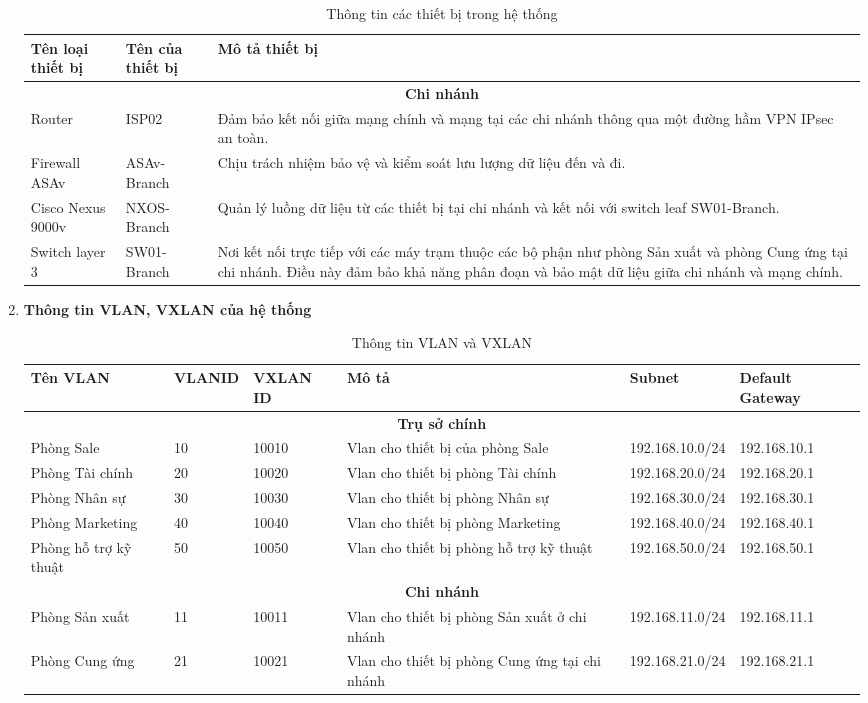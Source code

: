 \documentclass[13pt]{article}
\begin{document}
\begin{enumerate}
\begin{table}[h!]
\centering
\begin{tabular}{|p{2cm}|p{5cm}|p{7cm}|}
\hline
\textbf{Tên loại thiết bị} & \textbf{Tên của thiết bị} & \textbf{Mô tả thiết bị} \\ 
\hline
\multicolumn{3}{|c|}{\textbf{Chi nhánh}} \\ 
\hline
Router & ISP02 & Đảm bảo kết nối giữa mạng chính và mạng tại các chi nhánh thông qua một đường hầm VPN IPsec an toàn.\\
\hline
Firewall ASAv & ASAv-Branch & Chịu trách nhiệm bảo vệ và kiểm soát lưu lượng dữ liệu đến và đi.\\
\hline
Cisco Nexus 9000v & NXOS-Branch & Quản lý luồng dữ liệu từ các thiết bị tại chi nhánh và kết nối với switch leaf SW01-Branch.\\
\hline
Switch layer 3 & SW01-Branch & Nơi kết nối trực tiếp với các máy trạm thuộc các bộ phận như phòng Sản xuất và phòng Cung ứng tại chi nhánh. Điều này đảm bảo khả năng phân đoạn và bảo mật dữ liệu giữa chi nhánh và mạng chính.\\
\hline
\end{tabular}
\caption{Thông tin các thiết bị trong hệ thống}
\label{tab:comparison}
\end{table}


\item \textbf{Thông tin VLAN, VXLAN của hệ thống}
\begin{table}[h!]
\centering
\begin{tabular}{|p{2cm}|p{2cm}|p{2cm}|p{2.5cm}|p{2.5cm}|p{2.5cm}|}
\hline
\textbf{Tên VLAN} & \textbf{VLANID} & \textbf{VXLAN ID} & \textbf{Mô tả} & \textbf{Subnet} & \textbf{Default Gateway}\\ 
\hline
\multicolumn{6}{|c|}{\textbf{Trụ sở chính}} \\ 
\hline
Phòng Sale & 10 & 10010 & Vlan cho thiết bị của phòng Sale & 192.168.10.0/24 & 192.168.10.1\\
\hline
Phòng Tài chính & 20 & 10020 & Vlan cho thiết bị phòng Tài chính & 192.168.20.0/24 & 192.168.20.1\\
\hline
Phòng Nhân sự & 30 & 10030 & Vlan cho thiết bị phòng Nhân sự & 192.168.30.0/24 & 192.168.30.1 \\
\hline
Phòng Marketing & 40 & 10040 & Vlan cho thiết bị phòng Marketing & 192.168.40.0/24 & 192.168.40.1\\
\hline
Phòng hỗ trợ kỹ thuật & 50 & 10050 & Vlan cho thiết bị phòng hỗ trợ kỹ thuật & 192.168.50.0/24 & 192.168.50.1\\
\hline
\multicolumn{6}{|c|}{\textbf{Chi nhánh}} \\ 
\hline
Phòng Sản xuất & 11 & 10011 & Vlan cho thiết bị phòng Sản xuất ở chi nhánh & 192.168.11.0/24 & 192.168.11.1\\
\hline
Phòng Cung ứng & 21 & 10021 & Vlan cho thiết bị phòng Cung ứng tại chi nhánh & 192.168.21.0/24 & 192.168.21.1\\
\hline
\end{tabular}
\caption{Thông tin VLAN và VXLAN}
\label{tab:comparison}
\end{table}


\end{enumerate}
\end{document}

